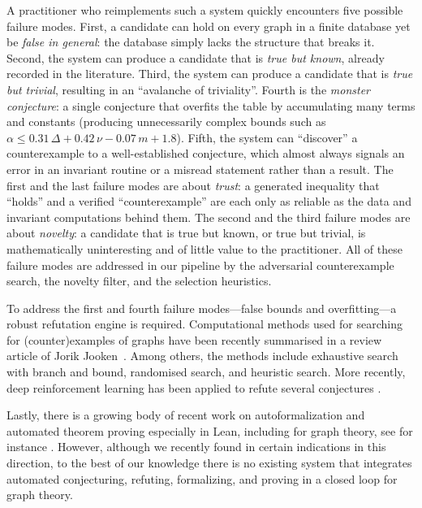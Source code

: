 \documentclass[]{ceurart}
\begin{document}
A practitioner who reimplements such a system quickly encounters five possible failure modes.
First, a candidate can hold on every graph in a finite database yet be
\emph{false in general}: the database simply lacks the structure that breaks
it. Second, the system can produce a candidate that is \emph{true but known}, already recorded in the literature. Third, the system can produce a candidate that is \emph{true but trivial}, resulting in an ``avalanche of triviality''. Fourth is the \emph{monster conjecture}: a single
conjecture that overfits the table by accumulating many terms and constants
(producing unnecessarily complex bounds such as $\alpha\le 0.31\,\Delta+0.42\,\nu-0.07\,m+1.8$).
Fifth, the system can ``discover'' a counterexample
to a well-established conjecture, which almost always signals an error in an
invariant routine or a misread statement rather than a result. The first and the last failure
modes are about \emph{trust}: a generated inequality that ``holds'' and a
verified ``counterexample'' are each only as reliable as the data and invariant computations behind them. The second and the third failure modes are about \emph{novelty}: a candidate that is true but known, or true but trivial, is mathematically uninteresting and of little value to the practitioner. All of these failure modes are addressed in our pipeline by the adversarial counterexample search, the novelty filter, and the selection heuristics. 

To address the first and fourth failure modes---false bounds and overfitting---a robust refutation engine is required. Computational methods used for searching for (counter)examples of graphs have been recently summarised in a review article of Jorik Jooken~\cite{jooken2025computer}. Among others, the methods include exhaustive search with branch and bound, randomised search, and heuristic search. More recently, deep reinforcement learning has been applied to refute several conjectures \cite{wagner2021constructions}.

Lastly, there is a growing body of recent work on autoformalization and automated theorem proving especially in Lean, including for graph theory, see for instance \cite{wu2022autoformalization,mavani2026chipfiring,nader2026gtbench,kalfus2026ramsey,zhang2026leanmarathon,deepseek2025prover}. However, although we recently found in \cite{davila2026graffiti3} certain indications in this direction, to the best of our knowledge there is no existing system that integrates automated conjecturing, refuting, formalizing, and proving in a closed loop for graph theory.
\end{document}
